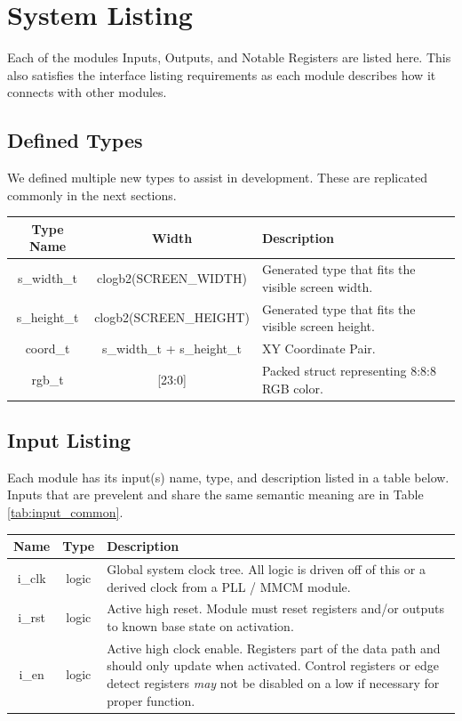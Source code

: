 \documentclass[12pt]{article}
\begin{document}
\section{System Listing}

Each of the modules Inputs, Outputs, and Notable Registers are listed here. This
also satisfies the interface listing requirements as each module describes how
it connects with other modules.

\subsection{Defined Types}

We defined multiple new types to assist in development. These are replicated
commonly in the next sections.

\begingroup
{}
\begin{tabularx}{\linewidth}{ ||c|c|X|| }
    \hline
    Type Name   & Width     & Description \\
    \hline
    s\_width\_t & clogb2(SCREEN\_WIDTH) & Generated type that fits the visible
    screen width. \\
    s\_height\_t & clogb2(SCREEN\_HEIGHT)  & Generated type that fits the visible
    screen height. \\
    coord\_t     &  s\_width\_t + s\_height\_t & XY Coordinate Pair. \\
    rgb\_t      & [23:0]    & Packed struct representing 8:8:8 RGB color. \\
    \hline
\end{tabularx}
\endgroup

\newpage
\subsection{Input Listing}
Each module has its input(s) name, type, and description listed in a table
below. Inputs that are prevelent and share the same semantic meaning are in Table
\ref{tab:input_common}.

\begingroup
{}
\label{tab:input_common}
\begin{tabularx}{\linewidth}{ ||c|c|X|| }
    \hline
    Name & Type & Description \\
    \hline
    i\_clk & logic & Global system clock tree. All logic is driven off of this
    or a derived clock from a PLL / MMCM module. \\
    i\_rst & logic & Active high reset. Module must reset registers and/or
    outputs to known base state on activation. \\
    i\_en   & logic & Active high clock enable. Registers part of the data path
    and should only update when activated. Control registers or edge detect
    registers \emph{may} not be disabled on a low if necessary for proper function. \\
    \hline
\end{tabularx}
\endgroup
\end{document}

